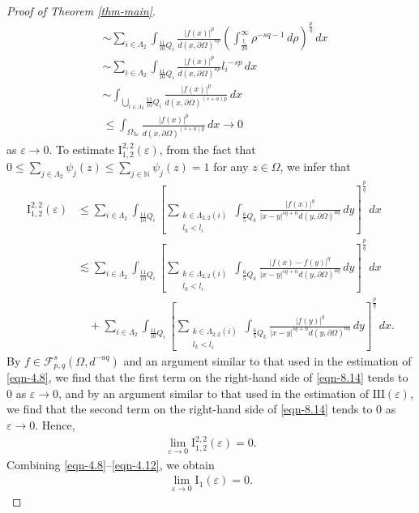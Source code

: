 \documentclass[11pt,twoside]{article}
\def\nn{{\mathbb N}}
\def\cf{{\mathcal F}}
\def\Qi{\frac{11}{10}Q_i}
\def\Qkk{\frac{6}{5}Q_k}
\def\boz{{\Omega}}
\def\vez{\varepsilon}
\def\pa{\partial}                %
\def\huae{\varepsilon}
\def\bozthreee{\boz_{3\huae}}
\def\huafwe{{\cf}_{p,q}^s(\boz,d^{-aq})}
\theoremstyle{mylem}
\theoremstyle{definition}
\numberwithin{equation}{section}
\begin{document}
\begin{proof}[Proof of Theorem \ref{thm-main}]
\begin{align}
&\sim\sum_{i \in \Lambda_2} \int_{\Qi} \frac{ |f(x)|^p}{{d(x,\pa\boz)}^{ap}} \left( \int_{\frac{l_i}{20}}^{\infty} \rho^{- sq - 1}\,d\rho \right)^{\frac{p}{q}}\,dx \nonumber \\
&\sim\sum_{i \in \Lambda_2} \int_{\Qi} \frac{ |f(x)|^p}{{d(x,\pa\boz)}^{ap}}  {l_i}^{-sp}\,dx
\nonumber\\
&\sim \int_{\bigcup_{i \in \Lambda_2} \Qi} \frac{| f(x)|^p}{d(x, \partial\Omega)^{(s+a) p}}\,dx \nonumber \\
&\leq \int_{\bozthreee}\frac{ |f(x)|^p}{d(x, \partial\Omega)^{(s+a)p}}\,dx \to 0 
\end{align}
as $\varepsilon \to 0$. To estimate $\mathrm{I}_{1,2}^{2,2}(\vez)$, from the fact that $0\leq\sum_{j\in\Lambda_2}\psi_j(z)\leq\sum_{j\in\nn}\psi_j(z)=1$ for any $z\in\boz$, we infer that
\begin{align}\label{eqn-8.14}
\mathrm{I}_{1,2}^{2,2}(\vez)
&\leq\sum_{i \in \Lambda_2} \int_{\Qi} \left[ \sum_{\substack{k\in\Lambda_{2,2}(i) \\ l_k< l_i}}\int_{\Qkk} \frac{| f(x)|^q }{|x - y|^{s q + n}d(y,\pa\boz)^{aq}}\,dy \right]^{\frac{p}{q}} \,dx \nonumber\\
&\lesssim \sum_{i \in \Lambda_2} \int_{\Qi} \left[ \sum_{\substack{k\in\Lambda_{2,2}(i) \\ l_k< l_i}}\int_{\Qkk} \frac{| f(x)-f(y)|^q }{|x - y|^{s q + n}d(y,\pa\boz)^{aq}}\,dy \right]^{\frac{p}{q}}\,dx \nonumber\\
&\quad+ \sum_{i \in \Lambda_2} \int_{\Qi} \left[ \sum_{\substack{k\in\Lambda_{2,2}(i) \\ l_k< l_i}}\int_{\Qkk}\frac{| f(y)|^q }{|x - y|^{s q + n}d(y,\pa\boz)^{aq}}\,dy \right]^{\frac{p}{q}} \,dx. 
\end{align}
By \( f \in \huafwe \) and an argument similar to that used in the estimation of \eqref{eqn-4.8}, we find that the first term on the right-hand side of \eqref{eqn-8.14} tends to 0 as $\vez\to 0$, and by  an argument similar to that used in the estimation of  $\mathrm{III}(\vez)$, we find that the second term on the right-hand side of \eqref{eqn-8.14} tends to 0 as $\vez\to 0$. Hence,
\begin{align}\label{eqn-4.12}
\lim_{\varepsilon \to 0}\mathrm{I}_{1,2}^{2,2}(\vez)= 0. 
\end{align}
Combining \eqref{eqn-4.8}--\eqref{eqn-4.12}, we obtain
\begin{align}\label{eqn-4.13}
\lim_{\varepsilon \to 0}\mathrm{I}_{1}(\vez)= 0. 
\end{align}


\end{proof}
\end{document}
